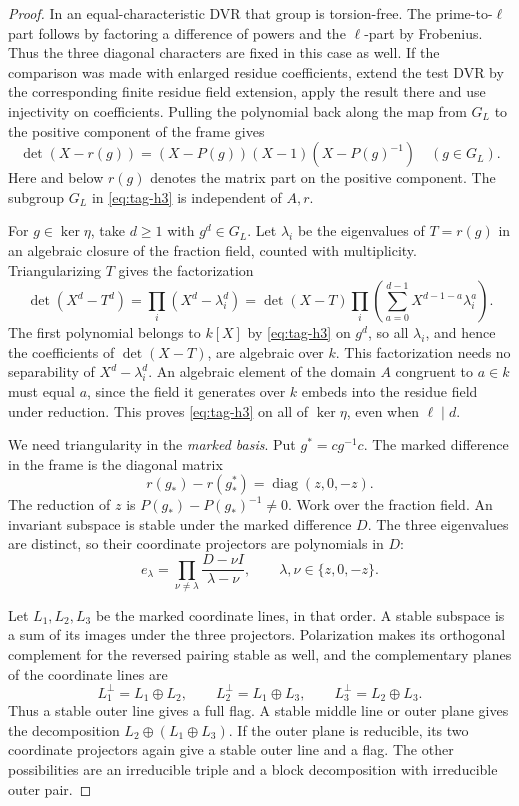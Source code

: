 \begin{proof}
In an equal-characteristic DVR that group is torsion-free.
The prime-to-\(\ell\) part follows by factoring a difference
of powers and the \(\ell\)-part by Frobenius. Thus the three
diagonal characters are fixed in this case as well. If the
comparison was made with enlarged residue coefficients, extend
the test DVR by the corresponding finite residue field
extension, apply the result there and use injectivity on
coefficients. Pulling the polynomial back along the map from
\(G_L\) to the positive component of the frame gives
\[
       \det(X-r(g))=(X-P(g))(X-1)(X-P(g)^{-1})
                        \quad(g\in G_L).
       \tag{H3}\label{eq:tag-h3}
\]
Here and below \(r(g)\) denotes the matrix part on the positive
component. The subgroup \(G_L\) in \eqref{eq:tag-h3} is independent of \(A,r\).

For \(g\in\ker\eta\), take \(d\ge1\) with \(g^d\in G_L\).
Let \(\lambda_i\) be the eigenvalues of \(T=r(g)\) in an
algebraic closure of the fraction field, counted with multiplicity.
Triangularizing \(T\) gives the factorization
\[
 \det(X^d-T^d)
   =\prod_i (X^d-\lambda_i^d)
   =\det(X-T)
       \prod_i\left(\sum_{a=0}^{d-1}X^{d-1-a}\lambda_i^a\right).
\]
The first polynomial belongs to \(k[X]\) by \eqref{eq:tag-h3} on \(g^d\),
so all \(\lambda_i\), and hence the coefficients of \(\det(X-T)\),
are algebraic over \(k\). This factorization needs no separability
of \(X^d-\lambda_i^d\). An algebraic element of the domain \(A\)
congruent to \(a\in k\) must equal \(a\), since the field it
generates over \(k\) embeds into the residue field under
reduction. This proves \eqref{eq:tag-h3} on all of \(\ker\eta\), even when
\(\ell\mid d\).

We need triangularity in the \emph{marked basis}. Put
\(g^*=cg^{-1}c\). The marked difference in the frame is the diagonal matrix
\[
 r(g_*)-r(g_*^*)=\operatorname{diag}(z,0,-z).
\]
The reduction of \(z\) is \(P(g_*)-P(g_*)^{-1}\ne0\).
Work over the fraction field. An invariant subspace is stable under the marked difference \(D\). The three eigenvalues are distinct, so their coordinate projectors are polynomials in \(D\):
\[
 e_\lambda=\prod_{\nu\ne\lambda}\frac{D-\nu I}{\lambda-\nu},\qquad \lambda,\nu\in\{z,0,-z\}.
\]

Let \(L_1,L_2,L_3\) be the marked coordinate lines, in that order.
A stable subspace is a sum of its images under the three projectors.
Polarization makes its orthogonal complement for the reversed pairing
stable as well, and the complementary planes of the coordinate lines are
\[
 L_1^\perp=L_1\oplus L_2,\qquad L_2^\perp=L_1\oplus L_3,\qquad
 L_3^\perp=L_2\oplus L_3 .
\]
Thus a stable outer line gives a full flag. A stable middle line or
outer plane gives the decomposition \(L_2\oplus(L_1\oplus L_3)\).
If the outer plane is reducible, its two coordinate projectors again
give a stable outer line and a flag. The other possibilities are an irreducible triple
and a block decomposition with irreducible outer pair.


\end{proof}
